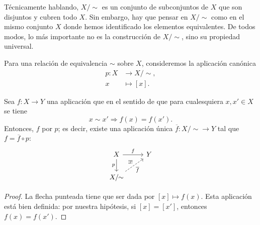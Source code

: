 Técnicamente hablando, $X/\!\!\sim$ es un conjunto de subconjuntos de $X$ que
son disjuntos y cubren todo $X$. Sin embargo, hay que pensar en $X/\!\!\sim$
como en el mismo conjunto $X$ donde hemos identificado los elementos
equivalentes. De todos modos, lo más importante no es la construcción de
$X/\!\!\sim$, sino su propiedad universal.

\begin{observacion}
  Para una relación de equivalencia $\sim$ sobre $X$, consideremos la aplicación
  canónica
  \begin{align*}
    p\colon X & \to X/\!\!\sim,\\
    x & \mapsto [x].
  \end{align*}

  Sea $f\colon X \to Y$ una aplicación que  en el
  sentido de que para cualesquiera $x,x' \in X$ se tiene
  $$x\sim x' \Longrightarrow f (x) = f (x').$$
  Entonces, $f$  por $p$; es decir, existe una
  aplicación única $\overline{f}\colon X/\!\!\sim \to Y$ tal que
  $f = \overline{f}\circ p$:
  \[ \begin{tikzcd}
      X\ar{r}{f}\ar{d}[swap]{p} & Y \\
      X/\!\!\sim\ar[dashed]{ur}{\exists !}[swap]{\overline{f}}
    \end{tikzcd} \]

  \begin{proof}
    La flecha punteada tiene que ser dada por $[x] \mapsto f (x)$. Esta
    aplicación está bien definida: por nuestra hipótesis, si $[x] = [x']$,
    entonces $f (x) = f (x')$.
  \end{proof}
\end{observacion}

